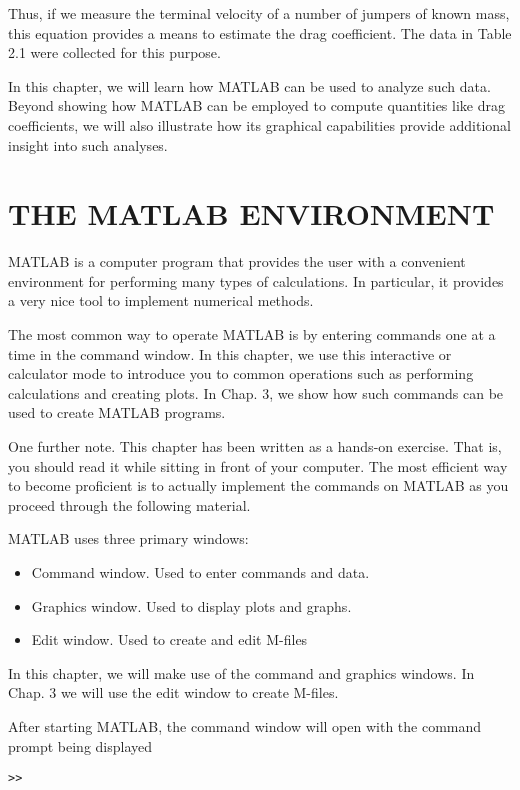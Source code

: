 \documentclass[../main.tex]{subfiles}
\begin{document}
	Thus, if we measure the terminal velocity of a number of jumpers of known mass, this
equation provides a means to estimate the drag coefficient. The data in Table 2.1 were collected for this purpose.


In this chapter, we will learn how MATLAB can be used to analyze such data. Beyond
showing how MATLAB can be employed to compute quantities like drag coefficients, we
will also illustrate how its graphical capabilities provide additional insight into such analyses.


\section{THE MATLAB ENVIRONMENT}


MATLAB is a computer program that provides the user with a convenient environment for
performing many types of calculations. In particular, it provides a very nice tool to implement numerical methods.


The most common way to operate MATLAB is by entering commands one at a time in
the command window. In this chapter, we use this interactive or calculator mode to introduce you to common operations such as performing calculations and creating plots. In
Chap. 3, we show how such commands can be used to create MATLAB programs.


One further note. This chapter has been written as a hands-on exercise. That is, you
should read it while sitting in front of your computer. The most efficient way to become
proficient is to actually implement the commands on MATLAB as you proceed through the
following material.


MATLAB uses three primary windows:
\begin{itemize}
	\item Command window. Used to enter commands and data.
	\item Graphics window. Used to display plots and graphs.
	\item Edit window. Used to create and edit M-files
\end{itemize}

In this chapter, we will make use of the command and graphics windows. In Chap. 3 we
will use the edit window to create M-files.


After starting MATLAB, the command window will open with the command prompt
being displayed



\begin{lstlisting}[frame=none, numbers=none]
	>>
\end{lstlisting}
\end{document}

